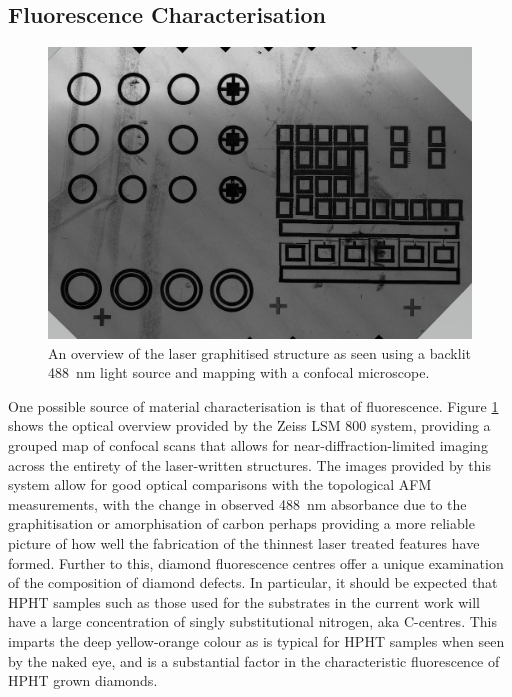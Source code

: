 \begin{refsection}
\subsection{Fluorescence Characterisation}
\label{subsec:fluorescence_characterisation}

\begin{figure}[H]
    \centering
    \includegraphics[width=\textwidth]{Chapter7/Figs/Raster/ESID_rotated_downscaled_further.jpg}
    \caption{An overview of the laser graphitised structure as seen using a backlit 488~\si{\nano\metre} light source and mapping with a confocal microscope.}
    \label{fig:bio_esid}
\end{figure}

One possible source of material characterisation is that of fluorescence. Figure \ref{fig:bio_esid} shows the optical overview provided by the Zeiss LSM 800 system, providing a grouped map of confocal scans that allows for near-diffraction-limited imaging across the entirety of the laser-written structures. The images provided by this system allow for good optical comparisons with the topological AFM measurements, with the change in observed 488~\si{\nano\metre} absorbance due to the graphitisation or amorphisation of carbon perhaps providing a more reliable picture of how well the fabrication of the thinnest laser treated features have formed. Further to this, diamond fluorescence centres offer a unique examination of the composition of diamond defects. In particular, it should be expected that HPHT samples such as those used for the substrates in the current work will have a large concentration of singly substitutional nitrogen, aka C-centres. This imparts the deep yellow-orange colour as is typical for HPHT samples when seen by the naked eye, and is a substantial factor in the characteristic fluorescence of HPHT grown diamonds. 


\end{refsection}
